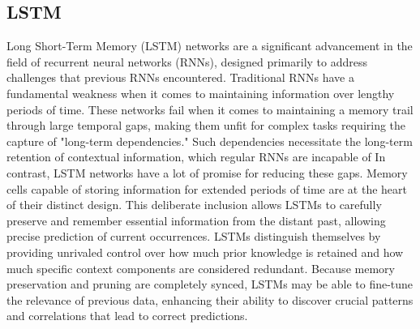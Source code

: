 \documentclass[a4paper,fleqn]{cas-sc}
\begin{document}
\subsection{LSTM}
Long Short-Term Memory (LSTM) networks are a significant advancement in the field of recurrent neural
networks (RNNs), designed primarily to address challenges that previous RNNs encountered. Traditional RNNs have a fundamental weakness when it comes to maintaining information over lengthy periods of time. These networks fail when it comes to maintaining a memory trail through large temporal gaps, making them unfit for complex tasks requiring the capture of "long-term dependencies." Such dependencies necessitate the long-term retention of contextual information, which regular RNNs are incapable of In contrast, LSTM networks have a lot of promise for reducing these gaps. Memory cells capable of storing information for extended periods of time are at the heart of their distinct design.\cite{abdel2020reliable} This deliberate inclusion allows LSTMs to carefully preserve and remember essential information from the distant past, allowing precise prediction of current occurrences. LSTMs distinguish themselves by providing unrivaled control over how much prior knowledge is retained and how much specific context components are considered redundant. Because memory preservation and pruning are completely synced, LSTMs may be able to fine-tune the relevance of previous data, enhancing their ability to discover crucial patterns and correlations that lead to correct predictions.\cite{shireen2018iterative}
\end{document}
